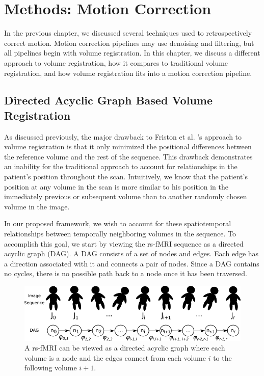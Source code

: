 \chapter{Methods: Motion Correction}
\label{ch:moco}

In the previous chapter, we discussed several techniques used to retrospectively correct motion. Motion correction pipelines may use denoising and filtering, but all pipelines begin with volume registration. In this chapter, we discuss a different approach to volume registration, how it compares to traditional volume registration, and how volume registration fits into a motion correction pipeline. 

\section{Directed Acyclic Graph Based Volume Registration}

As discussed previously, the major drawback to Friston et al. 's approach to volume registration is that it only minimized the positional differences between the reference volume and the rest of the sequence. This drawback demonstrates an inability for the traditional approach to account for relationships in the patient's position throughout the scan. Intuitively, we know that the patient's position at any volume in the scan is more similar to his position in the immediately previous or subsequent volume than to another randomly chosen volume in the image.

In our proposed framework, we wish to account for these spatiotemporal relationships between temporally neighboring volumes in the sequence. To accomplish this goal, we start by viewing the rs-fMRI sequence as a directed acyclic graph (DAG). A DAG consists of a set of nodes and edges. Each edge has a direction associated with it and connects a pair of nodes. Since a DAG contains no cycles, there is no possible path back to a node once it has been traversed. 

\begin{figure}
\centering
\includegraphics[width=.7\textwidth]{3/dag-chain.png}
\caption{A rs-fMRI can be viewed as a directed acyclic graph where each volume is a node and the edges connect from each volume $i$ to the following volume $i+1$.}
\label{ch3:fig:dag-chain}
\end{figure}

